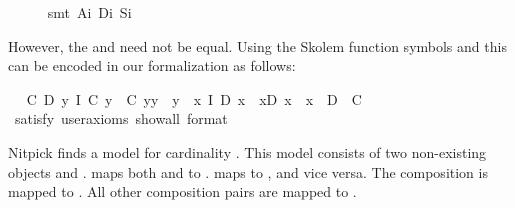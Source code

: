 \begin{isabellebody}
%
\isadelimproof
\ \ \ \ %
\endisadelimproof
%
\isatagproof
{}\isamarkupfalse%
\ {\isacharparenleft}smt\ A\isactrlsub i\ D\isactrlsub i\ S\isactrlsub i{\isacharparenright}%
\endisatagproof
{\isafoldproof}%
%
\isadelimproof
%
\endisadelimproof
%
\begin{isamarkuptext}%
However, the  and  need not be equal. Using the Skolem 
   function symbols  and  this can be encoded in
   our formalization as follows:%
\end{isamarkuptext}\isamarkuptrue%
\ \isamarkupfalse%
\ {\isachardoublequoteopen}{\isacharparenleft}{\isasymexists}C\ D{\isachardot}\ {\isacharparenleft}\isactrlbold {\isasymforall}y{\isachardot}\ I\ {\isacharparenleft}C\ y{\isacharparenright}\ \isactrlbold {\isasymand}\ {\isacharparenleft}C\ y{\isacharparenright}{\isasymcdot}y\ {\isasymcong}\ y{\isacharparenright}\ \isactrlbold {\isasymand}\ {\isacharparenleft}\isactrlbold {\isasymforall}x{\isachardot}\ I\ {\isacharparenleft}D\ x{\isacharparenright}\ \isactrlbold {\isasymand}\ x{\isasymcdot}{\isacharparenleft}D\ x{\isacharparenright}\ {\isasymcong}\ x{\isacharparenright}\ \isactrlbold {\isasymand}\ \isactrlbold {\isasymnot}{\isacharparenleft}D\ {\isacharequal}\ C{\isacharparenright}{\isacharparenright}{\isachardoublequoteclose}\isanewline
\ \ \ \isamarkupfalse%
\ {\isacharbrackleft}satisfy{\isacharcomma}\ user{\isacharunderscore}axioms{\isacharcomma}\ show{\isacharunderscore}all{\isacharcomma}\ format\ {\isacharequal}\ {}{\isacharbrackright}%
\isadelimproof
\ %
\endisadelimproof
%
\isatagproof
{}\isamarkupfalse%
\ \ %
%
\endisatagproof
{\isafoldproof}%
%
\isadelimproof
%
\endisadelimproof
%
\begin{isamarkuptext}%
Nitpick finds a model for cardinality . This model consists of two non-existing
   objects  and .  maps both  and  to
   .  maps  to , and vice versa. The composition 
   is mapped to . All other composition pairs are mapped to .%
\end{isamarkuptext}\isamarkuptrue%
%
\begin{isamarkuptext}%

\end{isamarkuptext}
\end{isabellebody}
